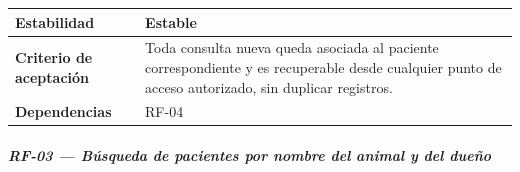 \documentclass[
]{article}
\begin{document}
{\begin{longtable}[]{|
  >{\raggedright\arraybackslash}p{}|
  >{\raggedright\arraybackslash}p{}|}
\hline
\textbf{Estabilidad} & \begin{minipage}[t]{\linewidth}\raggedright
Estable
\end{minipage} \\
\hline
\textbf{Criterio de aceptación} &
\begin{minipage}[t]{\linewidth}\raggedright
Toda consulta nueva queda asociada al paciente correspondiente y es recuperable desde cualquier punto de acceso autorizado, sin duplicar registros.
\end{minipage} \\
\hline
\textbf{Dependencias} & \begin{minipage}[t]{\linewidth}\raggedright
RF-04
\end{minipage} \\
\hline
\end{longtable}
}

\subparagraph{RF-03 --- Búsqueda de pacientes por nombre del animal y del dueño}\label{rf-03-b-squeda-de-pacientes-por-nombre-del-ani}
\end{document}

